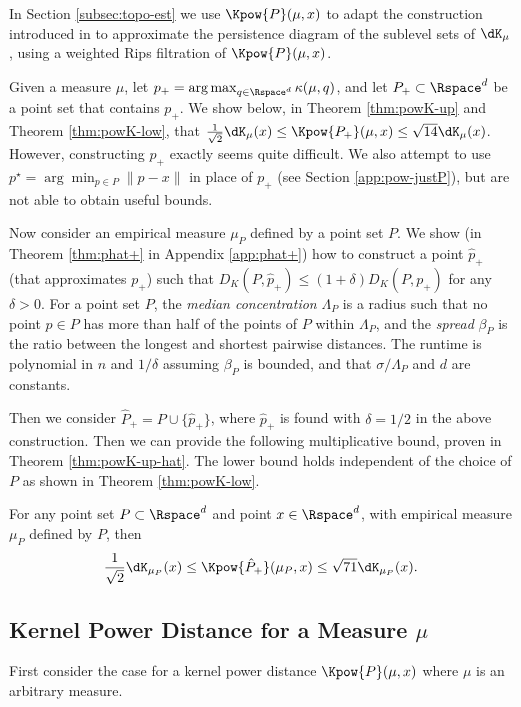 \documentclass[11pt]{myclass}
\begin{document}
In Section \ref{subsec:topo-est} we use $\Kpow{P}(\mu,x)$ to adapt the construction introduced in \cite{BuchetChazalOudot2013} to approximate the persistence diagram of the sublevel sets of $\dK_\mu$, using a weighted Rips filtration of $\Kpow{P}(\mu,x)$. 

Given a measure $\mu$, let $p_+ = \arg \max_{q \in \Rspace^d} \kappa(\mu,q)$, and let $P_+ \subset \Rspace^d$ be a point set that contains $p_+$.  We show below, in Theorem \ref{thm:powK-up} and Theorem \ref{thm:powK-low}, that $\frac{1}{\sqrt{2}} \dK_\mu(x) \leq \Kpow{P_+}(\mu,x) \leq \sqrt{14} \dK_\mu(x)$.  
However, constructing $p_+$ exactly seems quite difficult.  
We also attempt to use $p^\star = \arg\min_{p \in P} \|p-x\|$ in place of $p_+$ (see Section \ref{app:pow-justP}), but are not able to obtain useful bounds.  

Now consider an empirical measure $\mu_P$ defined by a point set $P$.  
We show (in Theorem \ref{thm:phat+} in Appendix \ref{app:phat+}) how to construct a point $\hat p_+$  (that approximates $p_+$) such that $D_K(P,\hat p_+) \leq (1+\delta) D_K(P, p_+)$ 
for any $\delta >0$.  For a point set $P$, the \emph{median concentration} $\Lambda_P$ is a radius such that no point $p \in P$ has more than half of the points of $P$ within $\Lambda_P$, 
and the \emph{spread} $\beta_P$ is the ratio between the longest and shortest pairwise distances.  
The runtime is polynomial in $n$ and $1/\delta$ assuming $\beta_P$ is bounded, and  that $\sigma/\Lambda_P$ and $d$ are constants.  

Then we consider $\hat P_+ = P \cup \{\hat p_+\}$, where $\hat p_+$ is found with $\delta = 1/2$ in the above construction.   Then we can provide the following multiplicative bound, proven in Theorem \ref{thm:powK-up-hat}.  The lower bound holds independent of the choice of $P$ as shown in Theorem \ref{thm:powK-low}.  

\begin{theorem}
\label{thm:powK-bnd}
For any point set $P \subset \Rspace^d$ and point $x \in \Rspace^d$, with empirical measure $\mu_P$ defined by $P$,  then 
\[
\frac{1}{\sqrt{2}} \dK_{\mu_P}(x) \leq \Kpow{\hat P_+}(\mu_P,x) \leq \sqrt{71} \dK_{\mu_P}(x).
\]
\end{theorem}





\subsection{Kernel Power Distance for a Measure $\mu$}
First consider the case for a kernel power distance $\Kpow{P}(\mu,x)$ where $\mu$ is an arbitrary measure.  
\end{document}

